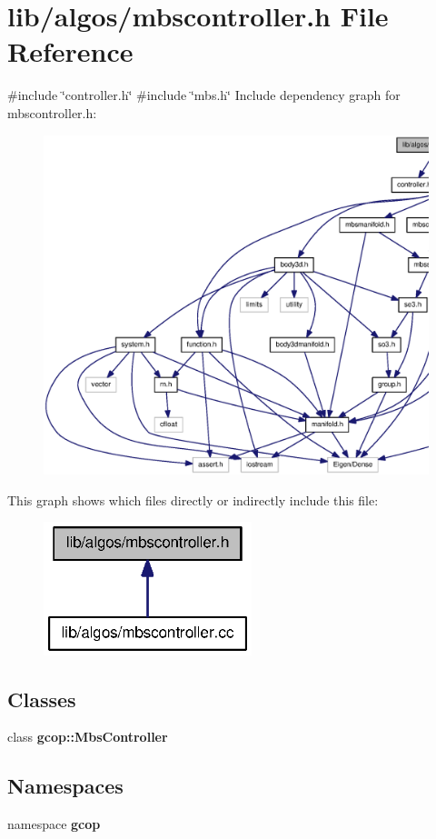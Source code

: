 \section{lib/algos/mbscontroller.h \-File \-Reference}
\label{mbscontroller_8h}
{\ttfamily \#include \char`\"{}controller.\-h\char`\"{}}\*
{\ttfamily \#include \char`\"{}mbs.\-h\char`\"{}}\*
\-Include dependency graph for mbscontroller.\-h\-:\nopagebreak
\begin{figure}[H]
\begin{center}
\leavevmode
\includegraphics[width=350pt]{mbscontroller_8h__incl}
\end{center}
\end{figure}
\-This graph shows which files directly or indirectly include this file\-:\nopagebreak
\begin{figure}[H]
\begin{center}
\leavevmode
\includegraphics[width=172pt]{mbscontroller_8h__dep__incl}
\end{center}
\end{figure}
\subsection*{\-Classes}
\begin{DoxyCompactItemize}
\item 
class {\bf gcop\-::\-Mbs\-Controller}
\end{DoxyCompactItemize}
\subsection*{\-Namespaces}
\begin{DoxyCompactItemize}
\item 
namespace {\bf gcop}
\end{DoxyCompactItemize}
